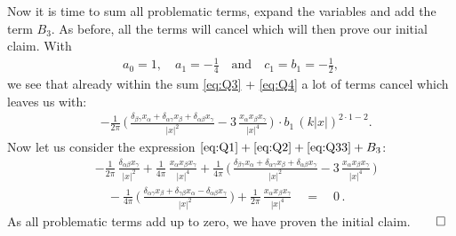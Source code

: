 Now it is time to sum all problematic terms, expand the variables and add the term $B_3$. 
As before, all the terms will cancel which will then prove our initial claim. 
With
\begin{align*}
  a_0 = 1, \quad a_1 = -\frac{1}{4} \quad\text{and}\quad c_1 = b_1 =  -\frac{1}{2},
\end{align*}
we see that already within the sum \eqref{eq:Q3} + \eqref{eq:Q4} a lot of terms cancel which leaves us with:
\begin{align*}
  \label{eq:Q33}
  \tag{Q3'}
  &- \frac{1}{2\pi} \, \bigg(\, \frac{\delta_{\beta\gamma} x_\alpha + \delta_{\alpha \gamma} x_\beta + \delta_{\alpha \beta} x_\gamma}{|x|^2} - 3\, \frac{x_\alpha x_\beta x_\gamma}{|x|^4} \, \bigg) 
  \, \cdot b_1 \, (k|x|)^{2\cdot 1 - 2}.
\end{align*}
Now let us consider the expression $\eqref{eq:Q1} + \eqref{eq:Q2} + \eqref{eq:Q33} + B_3$:
\begin{align*}
  &-\frac{1}{2\pi} \,  \frac{\delta_{\alpha\beta} x_\gamma}{|x|^2} 
  + \frac{1}{4 \pi }\, \frac{x_\alpha x_\beta x_\gamma}{|x|^4} 
  + \frac{1}{4\pi} \, \bigg(\,\frac{\delta_{\beta\gamma} x_\alpha + \delta_{\alpha \gamma} x_\beta + \delta_{\alpha \beta} x_\gamma}{|x|^2} - 3\, \frac{x_\alpha x_\beta x_\gamma}{|x|^4} \, \bigg) 
   \\[0.5em]
 &\quad - \frac{1}{4 \pi} \, \bigg(\, \frac{\delta_{\alpha\gamma} x_\beta + \delta_{\gamma\beta} x_\alpha  - \delta_{\alpha\beta} x_\gamma}{|x|^2} \, \bigg) 
  + \frac{1}{2\pi}\,  \frac{x_\alpha x_\beta x_\gamma}{|x|^4}
  \quad = \quad 0\, .
\end{align*}
As all problematic terms add up to zero, we have proven the initial claim.\hfill$\qed$

